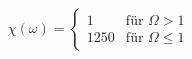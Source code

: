 \documentclass{article}
\begin{document}
\begin{equation}
\chi(\omega) = \begin{cases}
1 &\text{für \(\Omega > 1 \)}\\
1250 &\text{für \(\Omega \leq 1 \)}
\end{cases}
\end{equation}
\end{document}
